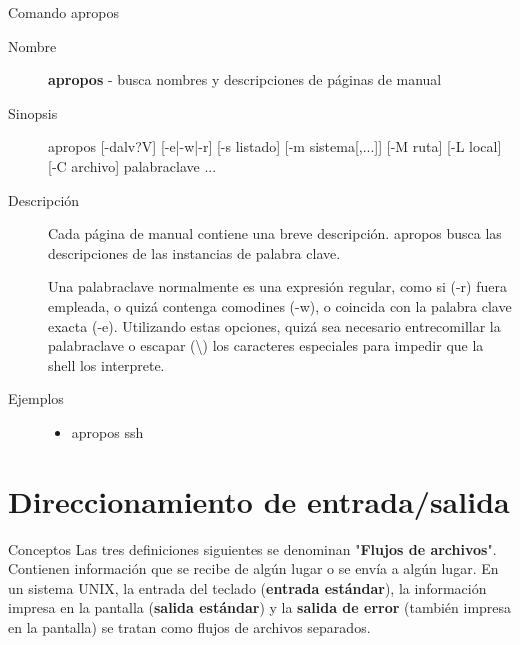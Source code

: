 \begin{frame}[c]{Comando apropos}
  \begin{description}
    \item[Nombre]
      \textbf{apropos} - busca nombres y descripciones de páginas de manual

    \vspace{\baselineskip}
    \item[Sinopsis]
      apropos [-dalv?V] [-e|-w|-r] [-s listado] [-m sistema[,...]] [-M ruta] [-L local] [-C archivo] palabraclave ...

    \vspace{\baselineskip}
    \item[Descripción]
      Cada página de manual contiene una breve descripción.
      apropos busca las descripciones de las instancias de palabra clave.

      Una palabraclave normalmente es una expresión regular, como si (-r)
      fuera empleada, o quizá contenga comodines (-w), o coincida con la
      palabra clave exacta (-e). Utilizando estas opciones, quizá sea
      necesario entrecomillar la palabraclave o escapar (\textbackslash{})
      los caracteres especiales para impedir que la shell los interprete.

    \vspace{\baselineskip}
    \item[Ejemplos]
      \begin{itemize}
        \item apropos ssh
      \end{itemize}
  \end{description}
\end{frame}

\section{Direccionamiento de entrada/salida}

\begin{frame}[c]{Conceptos}
  Las tres definiciones siguientes se denominan "\textbf{Flujos de archivos}".
  Contienen información que se recibe de algún lugar o se envía a algún lugar.
  En un sistema UNIX, la entrada del teclado (\textbf{entrada estándar}),
  la información impresa en la pantalla (\textbf{salida estándar}) y la
  \textbf{salida de error} (también impresa en la pantalla) se tratan como
  flujos de archivos separados.
\end{frame}

